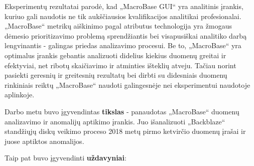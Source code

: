\documentclass{VUMIFPSkursinis}
\begin{document}
Eksperimentų rezultatai parodė, kad „MacroBase GUI“ yra analitinis įrankis, kuriuo gali naudotis ne tik aukščiausios kvalifikacijos analitikai profesionalai. „MacroBase“ metrikų aiškinimo pagal atributus technologija yra žmogaus dėmesio prioritizavimo problemą sprendžiantis bei visapusiškai analitiko darbą lengvinantis - galingas priedas analizavimo procesui. Be to, „MacroBase“ yra optimalus įrankis gebantis analizuoti didelius kiekius duomenų greitai ir efektyviai, net ribotų skaičiavimo ir atminties išteklių atveju. Tačiau norint pasiekti geresnių ir greitesnių rezultatų bei dirbti su didesniais duomenų rinkiniais reiktų „MacroBase“ naudoti galingesnėje nei eksperimentui naudotoje aplinkoje.


Darbo metu buvo įgyvendintas \textbf{tikslas} - panaudotas „MacroBase“ duomenų analizavimo ir anomalijų aptikimo įrankis. Juo išanalizuoti „Backblaze“ standžiųjų diskų veikimo proceso 2018 metų pirmo ketvirčio duomenų įrašai ir juose aptiktos anomalijos.\par

Taip pat buvo įgyvendinti \textbf{uždavyniai}:
\end{document}
